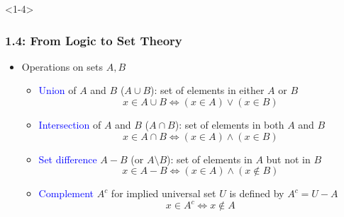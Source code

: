 \documentclass[10pt,english,aspectratio=169]{beamer}
\begin{document}
\begin{frame}<1-4> \frametitle{1.4: From Logic to Set Theory}

\begin{itemize}
\setlength\itemsep{3mm}
\item<1-> Operations on sets $A,B$ \vspace{1mm}
\begin{itemize} 
  \setlength\itemsep{1.5mm}
  \item<1-> \textcolor{blue}{Union} of $A$ and $B$ ($A\cup B$): set of elements in either $A$ or $B$
\[ x\in A\cup B \Leftrightarrow (x\in A)\vee (x\in B) \]
  \item<2-> \textcolor{blue}{Intersection} of $A$ and $B$ ($A\cap B$): set of elements in both $A$ and $B$
\[ x\in A\cap B \Leftrightarrow (x\in A)\wedge (x\in B) \]
  \item<3-> \textcolor{blue}{Set difference} $A-B$ (or $A \setminus \!B$): set of elements in $A$ but not in $B$
\[ x\in A-B \Leftrightarrow (x\in A)\wedge (x\notin B) \]
  \item<4-> \textcolor{blue}{Complement} $A^c$ for implied universal set $U$ is defined by $A^c = U-A$
  \[ x\in A^c \Leftrightarrow x \notin A \]
\end{itemize}


\end{itemize}


\end{frame}
\end{document}
